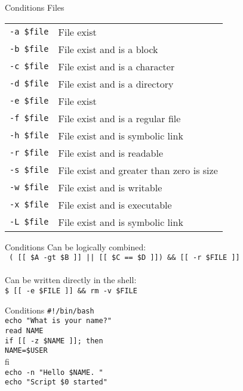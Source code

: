\documentclass{beamer}
\let\tt\texttt
\begin{document}
\begin{frame}{Conditions}
        Files      \\
        \begin{tabular}{l l}
                \tt{-a \$file}    &   File exist                    \\
                \tt{-b \$file}    &   File exist and is a block     \\
                \tt{-c \$file}    &   File exist and is a character \\
                \tt{-d \$file}    &   File exist and is a directory \\
                \tt{-e \$file}    &   File exist                    \\
                \tt{-f \$file}    &   File exist and is a regular file  \\
                \tt{-h \$file}    &   File exist and is symbolic link   \\
                \tt{-r \$file}    &   File exist and is readable    \\
                \tt{-s \$file}    &   File exist and greater than zero is size \\
                \tt{-w \$file}    &   File exist and is writable    \\
                \tt{-x \$file}    &   File exist and is executable  \\
                \tt{-L \$file}    &   File exist and is symbolic link   \\
        \end{tabular}
\end{frame}

\begin{frame}{Conditions}
        Can be logically combined: \\
        \tt{ ( [[ \$A -gt \$B ]] || [[ \$C == \$D ]]) \&\& [[ -r \$FILE ]] } \\
        \quad \\
        Can be written directly in the shell:   \\
        \tt{\$ [[ -e \$FILE ]] \&\& rm -v \$FILE} \\
\end{frame}

\begin{frame}{Conditions}
        \tt{\#!/bin/bash}                   \\
        \tt{echo "What is your name?"}      \\
        \tt{read NAME}                      \\
        \tt{if [[ -z \$NAME ]]; then}       \\
        \quad \tt{NAME=\$USER}              \\
        fi                                  \\
        \tt{echo -n "Hello \$NAME. "}       \\
        \tt{echo "Script \$0 started"}      \\
\end{frame}
\end{document}

